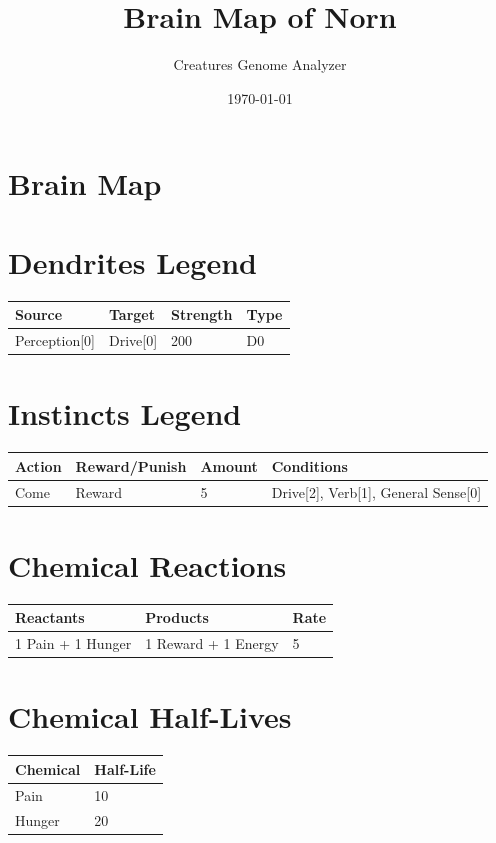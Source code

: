 \documentclass{article}
\title{Brain Map of Norn}
\author{Creatures Genome Analyzer}
\date{\today}
\begin{document}
\maketitle

\section*{Brain Map}

\begin{center}
\end{center}

\newpage

\section*{Dendrites Legend}

\begin{longtable}{|p{3cm}|p{3cm}|p{3cm}|p{3cm}|}
\hline
{\bf Source} & {\bf Target} & {\bf Strength} & {\bf Type} \\ \hline
Perception[0] & Drive[0] & 200 & D0 \\ \hline
\end{longtable}

\section*{Instincts Legend}

\begin{longtable}{|p{3cm}|p{3cm}|p{3cm}|p{3cm}|}
\hline
{\bf Action} & {\bf Reward/Punish} & {\bf Amount} & {\bf Conditions} \\ \hline
Come & Reward & 5 & Drive[2], Verb[1], General Sense[0] \\ \hline
\end{longtable}

\section*{Chemical Reactions}

\begin{longtable}{|p{4cm}|p{4cm}|p{2cm}|}
\hline
{\bf Reactants} & {\bf Products} & {\bf Rate} \\ \hline
1 Pain + 1 Hunger & 1 Reward + 1 Energy & 5 \\ \hline
\end{longtable}

\section*{Chemical Half-Lives}

\begin{longtable}{|p{4cm}|p{4cm}|}
\hline
{\bf Chemical} & {\bf Half-Life} \\ \hline
Pain & 10 \\ \hline
Hunger & 20 \\ \hline
\end{longtable}
\end{document}
